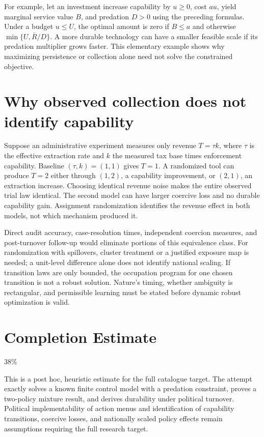 \documentclass[11pt]{article}
\begin{document}
For example, let an investment increase capability by $u\geq0$, cost $au$, yield marginal service value $B$, and predation $D>0$ using the preceding formulas. Under a budget $u\leq U$, the optimal amount is zero if $B\leq a$ and otherwise $\min\{U,\bar R/D\}$. A more durable technology can have a smaller feasible scale if its predation multiplier grows faster. This elementary example shows why maximizing persistence or collection alone need not solve the constrained objective.

\section{Why observed collection does not identify capability}
Suppose an administrative experiment measures only revenue $T=\tau k$, where $\tau$ is the effective extraction rate and $k$ the measured tax base times enforcement capability. Baseline $(\tau,k)=(1,1)$ gives $T=1$. A randomized tool can produce $T=2$ either through $(1,2)$, a capability improvement, or $(2,1)$, an extraction increase. Choosing identical revenue noise makes the entire observed trial law identical. The second model can have larger coercive loss and no durable capability gain. Assignment randomization identifies the revenue effect in both models, not which mechanism produced it.

Direct audit accuracy, case-resolution times, independent coercion measures, and post-turnover follow-up would eliminate portions of this equivalence class. For randomization with spillovers, cluster treatment or a justified exposure map is needed; a unit-level difference alone does not identify national scaling. If transition laws are only bounded, the occupation program for one chosen transition is not a robust solution. Nature's timing, whether ambiguity is rectangular, and permissible learning must be stated before dynamic robust optimization is valid.

\section{Completion Estimate}
38\%

This is a post hoc, heuristic estimate for the full catalogue target.
The attempt exactly solves a known finite control model with a predation constraint, proves a two-policy mixture result, and derives durability under political turnover. Political implementability of action menus and identification of capability transitions, coercive losses, and nationally scaled policy effects remain assumptions requiring the full research target.
\end{document}
